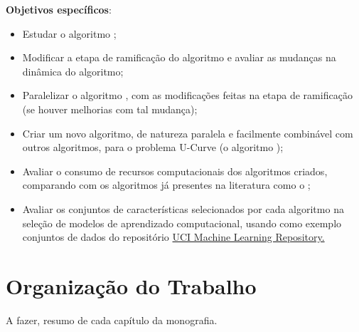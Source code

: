 {\bf Objetivos específicos}:
\begin{itemize}
\item{Estudar o algoritmo ;}
\item{Modificar a etapa de ramificação do algoritmo  e 
    avaliar as mudanças na dinâmica do algoritmo;}
\item{Paralelizar o algoritmo , com as modificações feitas
    na etapa de ramificação (se houver melhorias com tal mudança);}
\item{Criar um novo algoritmo, de natureza paralela e facilmente 
    combinável com outros algoritmos, para o problema U-Curve (o 
    algoritmo );}
\item{Avaliar o consumo de recursos computacionais dos algoritmos 
    criados, comparando com os algoritmos já presentes na literatura 
    como o ;}
\item{Avaliar os conjuntos de características selecionados por cada 
    algoritmo na seleção de modelos de aprendizado computacional, usando 
    como exemplo conjuntos de dados do repositório 
    \href{https://archive.ics.uci.edu/ml/index.php}
        {UCI Machine Learning Repository.}}
\end{itemize}

\section{Organização do Trabalho}

A fazer, resumo de cada capítulo da monografia.

